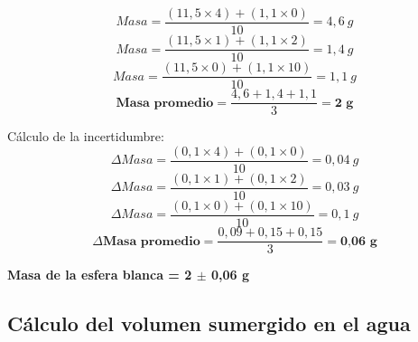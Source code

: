 \documentclass[10pt]{article}
\begin{document}
\begin{equation*} 
    Masa = \frac{(11,5\times4)+(1,1\times0)}{10} = 4,6~g
\end{equation*}
\begin{equation*}
    Masa = \frac{(11,5\times1)+(1,1\times2)}{10} = 1,4~g
\end{equation*}
\begin{equation*}
    Masa = \frac{(11,5\times0)+(1,1\times10)}{10} = 1,1~g
\end{equation*}
\vspace{0.2cm}
\begin{equation*}
    \textbf{Masa~promedio}= \frac{4,6+1,4+1,1}{3} = \textbf{2~g}
\end{equation*}
\vspace{0.1cm}

Cálculo de la incertidumbre:
\begin{equation*}
     \Delta Masa =\frac{(0,1\times4)+(0,1\times0)}{10} = 0,04~g
\end{equation*}
\begin{equation*}
     \Delta Masa =\frac{(0,1\times1)+(0,1\times2)}{10} = 0,03~g
\end{equation*}
\begin{equation*}
     \Delta Masa =\frac{(0,1\times0)+(0,1\times10)}{10} = 0,1~g
\end{equation*}
\vspace{0.2cm}
\begin{equation*}
    \Delta \textbf{Masa~promedio} = \frac{0,09+0,15+0,15}{3} = \textbf{0,06~g}
\end{equation*}

\vspace{0.3cm}
\begin{center}
    \textbf{Masa de la esfera blanca = 2 $\pm$ 0,06 g}
\end{center}
\vspace{0.3cm}

\subsection{Cálculo del volumen sumergido en el agua}
\vspace{2mm}
\end{document}
